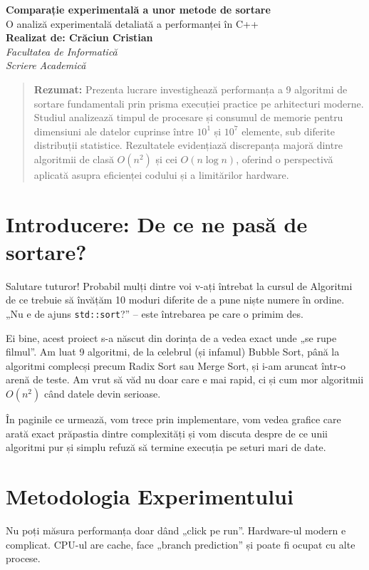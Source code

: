 \documentclass[12pt, a4paper]{article}
\begin{document}
\begin{center}
    \vspace*{1.5cm}
    {\Huge \textbf{Comparație experimentală a unor metode de sortare}}\\
    {\Large O analiză experimentală detaliată a performanței în C++}\\[1cm]
    \textbf{Realizat de: Crăciun Cristian} \\
    \textit{Facultatea de Informatică} \\
    \textit{Scriere Academică}
\end{center}

\begin{quotation}
\noindent \textbf{Rezumat:} 
Prezenta lucrare investighează performanța a 9 algoritmi de sortare fundamentali prin prisma execuției practice pe arhitecturi moderne. Studiul analizează timpul de procesare și consumul de memorie pentru dimensiuni ale datelor cuprinse între $10^1$ și $10^7$ elemente, sub diferite distribuții statistice. Rezultatele evidențiază discrepanța majoră dintre algoritmii de clasă $O(n^2)$ și cei $O(n \log n)$, oferind o perspectivă aplicată asupra eficienței codului și a limitărilor hardware.
\end{quotation}

\section*{Introducere: De ce ne pasă de sortare?}
Salutare tuturor! Probabil mulți dintre voi v-ați întrebat la cursul de Algoritmi de ce trebuie să învățăm 10 moduri diferite de a pune niște numere în ordine. „Nu e de ajuns \texttt{std::sort}?” – este întrebarea pe care o primim des. 

Ei bine, acest proiect s-a născut din dorința de a vedea exact unde „se rupe filmul”. Am luat 9 algoritmi, de la celebrul (și infamul) Bubble Sort, până la algoritmi complecși precum Radix Sort sau Merge Sort, și i-am aruncat într-o arenă de teste. Am vrut să văd nu doar care e mai rapid, ci și cum mor algoritmii $O(n^2)$ când datele devin serioase. 

În paginile ce urmează, vom trece prin implementare, vom vedea grafice care arată exact prăpastia dintre complexități și vom discuta despre de ce unii algoritmi pur și simplu refuză să termine execuția pe seturi mari de date.

\section{Metodologia Experimentului}
Nu poți măsura performanța doar dând „click pe run”. Hardware-ul modern e complicat. CPU-ul are cache, face „branch prediction” și poate fi ocupat cu alte procese.
\end{document}
